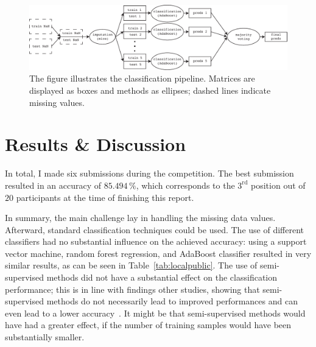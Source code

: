 \documentclass[a4paper]{article}
\begin{document}
\begin{figure}[h!]
\begin{center}
\includegraphics[width=1\columnwidth]{pipeline}
\caption{{\label{fig:pipeline} The figure illustrates the classification pipeline. Matrices are displayed as boxes and methods as ellipses; dashed lines indicate missing values.%
}}
\end{center}
\end{figure}

\section{Results \& Discussion}
\label{sec:results}

In total, I made six submissions during the competition. The best
submission resulted in an accuracy of $85.494\,\%$, which corresponds
to the $3^{\text{rd}}$ position out of $20$ participants at the time
of finishing this report.

In summary, the main challenge lay in handling the missing data
values.  Afterward, standard classification techniques could be
used. The use of different classifiers had no substantial influence on
the achieved accuracy: using a support vector machine, random forest
regression, and AdaBoost classifier resulted in very similar results,
as can be seen in Table~\ref{tab:localpublic}. The use of
semi-supervised methods did not have a substantial effect on the
classification performance; this is in line with findings other
studies, showing that semi-supervised methods do not necessarily lead
to improved performances and can even lead to a lower
accuracy~\cite{zhu2005semi}. It might be that semi-supervised methods
would have had a greater effect, if the number of training samples
would have been substantially smaller.
\end{document}
